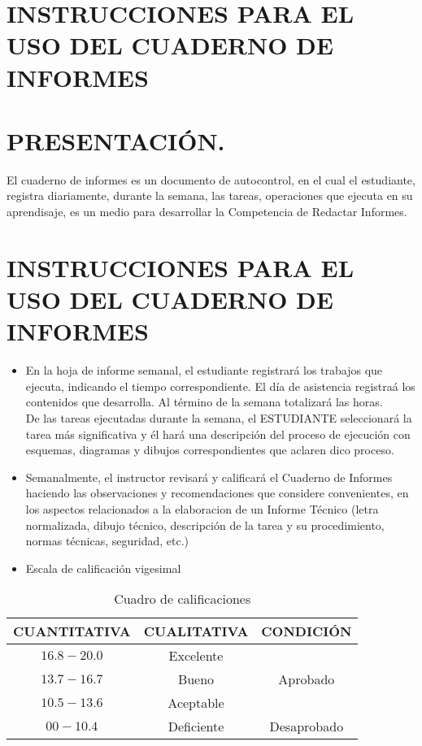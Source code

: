 \section*{\centering\textbf{INSTRUCCIONES PARA EL USO DEL CUADERNO DE INFORMES}}
\vspace{1cm}
\section{\normalsize{ PRESENTACIÓN.}}

El cuaderno de informes es un documento de autocontrol, en el cual el estudiante,
registra diariamente, durante la semana, las tareas, operaciones que ejecuta en su
aprendisaje, es un medio para desarrollar la Competencia de Redactar Informes. 

\section{\normalsize{INSTRUCCIONES PARA EL USO DEL CUADERNO DE INFORMES}}
\begin{itemize}
\item {En la hoja de informe semanal, el estudiante registrará los trabajos
que ejecuta, indicando el tiempo correspondiente. El día de asistencia 
registraá los contenidos que desarrolla. Al término de la semana totalizará
las horas.\\
De las tareas ejecutadas durante la semana, el ESTUDIANTE seleccionará la 
tarea más significativa y él hará una descripción del proceso de ejecución 
con esquemas, diagramas y dibujos correspondientes que aclaren dico proceso.}

\item {Semanalmente, el instructor revisará y calificará el Cuaderno de Informes
haciendo las observaciones y recomendaciones que considere convenientes, en los 
aspectos relacionados a la elaboracion de un Informe Técnico (letra normalizada,
dibujo técnico, descripción de la tarea y su procedimiento, normas técnicas,
seguridad, etc.)}

\item {Escala de calificación vigesimal}
\end {itemize}

\vspace{2cm}

\begin{table}[!ht]
  \centering
  \begin{tabular}{| c | c | c |}
    \hline
    \rowcolor{gray!30}
    \textbf{CUANTITATIVA} & \textbf{CUALITATIVA} & \textbf{CONDICIÓN} \\ \hline
    $16.8-20.0$ & Excelente & \multirow{3}{*}{Aprobado} \\ \cline{1-2}
    $13.7-16.7$ & Bueno &  \\ \cline{1-2}
    $10.5-13.6$ & Aceptable &  \\ \hline
    $00-10.4$   & Deficiente & Desaprobado \\ \hline
  \end{tabular}
  \caption{Cuadro de calificaciones}
  \label{tab:calificaciones}
\end{table}

